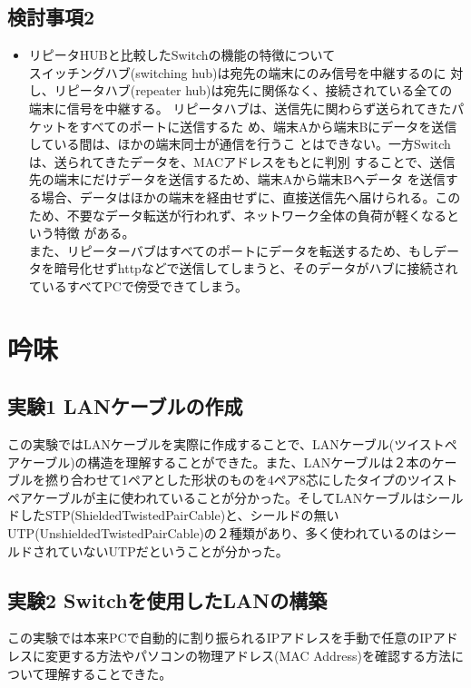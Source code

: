 \documentclass[10pt]{article}
\begin{document}
\subsection{検討事項2}
\begin{itemize}
    \item リピータHUBと比較したSwitchの機能の特徴について \\
        スイッチングハブ(switching hub)は宛先の端末にのみ信号を中継するのに 対し、リピータハブ(repeater hub)は宛先に関係なく、接続されている全ての端末に信号を中継する。
        リピータハブは、送信先に関わらず送られてきたパケットをすべてのポートに送信するた め、端末Aから端末Bにデータを送信している間は、ほかの端末同士が通信を行うこ とはできない。一方Switchは、送られてきたデータを、MACアドレスをもとに判別 することで、送信先の端末にだけデータを送信するため、端末Aから端末Bへデータ を送信する場合、データはほかの端末を経由せずに、直接送信先へ届けられる。この ため、不要なデータ転送が行われず、ネットワーク全体の負荷が軽くなるという特徴 がある。\\ また、リピーターバブはすべてのポートにデータを転送するため、もしデータを暗号化せずhttpなどで送信してしまうと、そのデータがハブに接続されているすべてPCで傍受できてしまう。
 
\end{itemize}

\pagebreak

\section{吟味}


\subsection{実験1 LANケーブルの作成}
この実験ではLANケーブルを実際に作成することで、LANケーブル(ツイストペアケーブル)の構造を理解することができた。また、LANケーブルは２本のケーブルを撚り合わせて1ペアとした形状のものを4ペア8芯にしたタイプのツイストペアケーブルが主に使われていることが分かった。そしてLANケーブルはシールドしたSTP(ShieldedTwistedPairCable)と、シールドの無いUTP(UnshieldedTwistedPairCable)の２種類があり、多く使われているのはシールドされていないUTPだということが分かった。

\subsection{実験2 Switchを使用したLANの構築}
この実験では本来PCで自動的に割り振られるIPアドレスを手動で任意のIPアドレスに変更する方法やパソコンの物理アドレス(MAC Address)を確認する方法について理解することできた。
\end{document}
